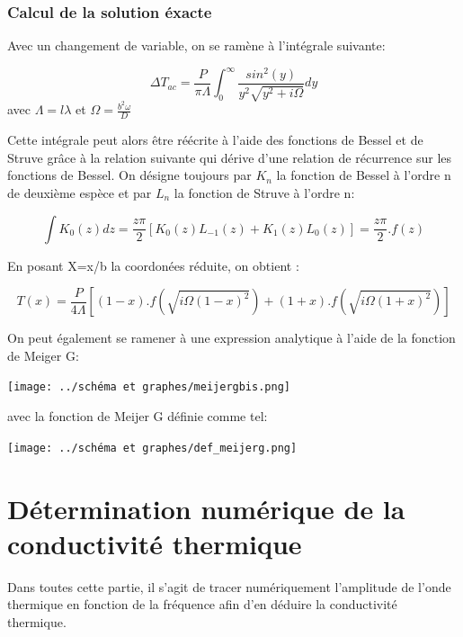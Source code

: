 \documentclass[10pt,a4paper]{report}
\begin{document}
\subsection{Calcul de la solution éxacte }
 Avec un changement de variable, on se ramène à l’intégrale suivante:
\begin{center}
\begin{equation}
\Delta T_{ac}=\frac{P}{\pi\Lambda}\int_{0}^\infty \frac{sin^2(y)}{y^2\sqrt{y^2+i\Omega}}dy
\end{equation}
avec $\Lambda=l\lambda$ et $\Omega=\frac{b^2\omega}{D}$
\end{center}
Cette intégrale peut alors être réécrite à l’aide des fonctions de Bessel et de Struve grâce à la relation suivante qui dérive d’une relation de récurrence sur les fonctions de Bessel. On désigne toujours par $K_{n}$ la fonction de Bessel à l’ordre n de deuxième espèce et par $L_{n}$ la fonction de Struve à l’ordre n:
\begin{center}
\begin{equation}
\int K_{0}(z)dz=\frac{z\pi}{2}[K_{0}(z)L_{-1}(z)+K_{1}(z)L_{0}(z)]=\frac{z\pi}{2}.f(z)
\end{equation}
\end{center}
En posant X=x/b la coordonées réduite, on obtient :
\begin{center}
\begin{equation}
T(x)=\frac{P}{4\Lambda}[(1-x).f(\sqrt{i\Omega(1-x)^2})+(1+x).f(\sqrt{i\Omega(1+x)^2})]
\end{equation}
\end{center}
\begin{center}
\end{center}
On peut également se ramener à une expression analytique à l’aide de la fonction de Meiger G:
\begin{center}
\texttt{[image: ../schéma et graphes/meijergbis.png]} 
\end{center}
avec la fonction de Meijer G définie comme tel:
\begin{center}
\texttt{[image: ../schéma et graphes/def\_meijerg.png]} 
\end{center}
\chapter{Détermination numérique de la conductivité thermique }
Dans toutes cette partie, il s'agit de tracer numériquement l'amplitude de l'onde thermique en fonction de la fréquence afin d'en déduire la conductivité thermique.
\end{document}
